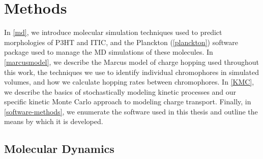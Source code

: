 \chapter{Methods}
\label{methods}



In \autoref{md}, we introduce molecular simulation techniques used to predict morphologies of P3HT and ITIC, and the Planckton (\autoref{planckton}) software package used to manage the MD simulations of these molecules. 
In \autoref{marcusmodel}, we describe the Marcus model of charge hopping used throughout this work, the techniques we use to identify individual chromophores in simulated volumes, and how we calculate hopping rates between chromophores.
In \autoref{KMC}, we describe the basics of stochastically modeling kinetic processes and our specific kinetic Monte Carlo approach to modeling charge transport.
Finally, in \autoref{software-methods}, we enumerate the software used in this thesis and outline the means by
which it is developed. 
 

\section{Molecular Dynamics}

\label{md}


